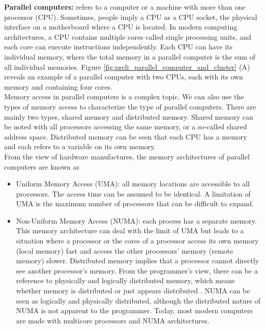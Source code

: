 \noindent \textbf{Parallel computers:} refers to a computer or a machine with more than one processor (CPU). Sometimes, people imply a CPU as a CPU socket, the physical interface on a motherboard where a CPU is located. In modern computing architectures, a CPU contains multiple cores called single processing units, and each core can execute instructions independently. Each CPU can have its individual memory, where the total memory in a parallel computer is the sum of all individual memories. Figure \ref{fig:preli_parallel_computer_and_cluster} (A) reveals an example of a parallel computer with two CPUs, each with its own memory and containing four cores.\\

Memory access in parallel computers is a complex topic. We can also use the types of memory access to characterize the type of parallel computers. There are mainly two types, shared memory and distributed memory. Shared memory can be noted with all processors accessing the same memory, or a so-called shared address space. Distributed memory can be seen that each CPU has a memory and each refers to a variable on its own memory.\\

From the view of hardware manufactures, the memory architectures of parallel computers are known as
\begin{itemize}
	\item Uniform Memory Access (UMA): all memory locations are accessible to all processors. The access time can be assumed to be identical. A limitation of UMA is the maximum number of processors that can be difficult to expand.
	
	\item Non-Uniform Memory Access (NUMA): each process has a separate memory. This memory architecture can deal with the limit of UMA but leads to a situation where a processor or the cores of a processor access its own memory (local memory) fast and access the other processors' memory (remote memory) slower. Distributed memory implies that a processor cannot directly see another processor's memory. From the programmer's view, there can be a reference to physically and logically distributed memory, which means whether memory is distributed or just appears distributed \cite{victor2010introhpc}. NUMA can be seen as logically and physically distributed, although the distributed nature of NUMA is not apparent to the programmer. Today, most modern computers are made with multicore processors and NUMA architectures.
\end{itemize}

